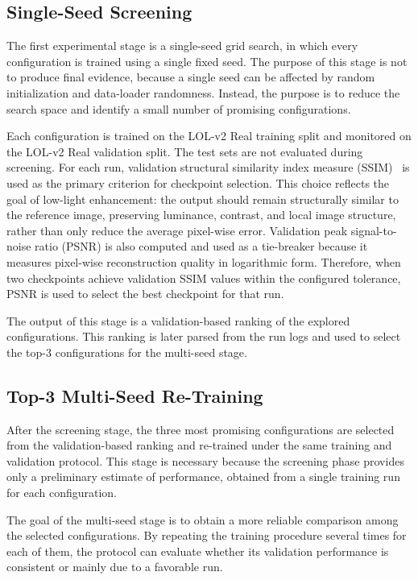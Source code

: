 

\subsection{Single-Seed Screening}

The first experimental stage is a single-seed grid search, in which every configuration is trained using a single fixed seed. The purpose of this stage is not to produce final evidence, because a single seed can be affected by random initialization and data-loader randomness. Instead, the purpose is to reduce the search space and identify a small number of promising configurations.

Each configuration is trained on the LOL-v2 Real training split and monitored on the LOL-v2 Real validation split. The test sets are not evaluated during screening. For each run, validation structural similarity index measure (SSIM)~\cite{DBLP:journals/tip/WangBSS04} is used as the primary criterion for checkpoint selection. This choice reflects the goal of low-light enhancement: the output should remain structurally similar to the reference image, preserving luminance, contrast, and local image structure, rather than only reduce the average pixel-wise error. Validation peak signal-to-noise ratio (PSNR) is also computed and used as a tie-breaker because it measures pixel-wise reconstruction quality in logarithmic form. Therefore, when two checkpoints achieve validation SSIM values within the configured tolerance, PSNR is used to select the best checkpoint for that run.

The output of this stage is a validation-based ranking of the explored configurations. This ranking is later parsed from the run logs and used to select the top-3 configurations for the multi-seed stage.

\subsection{Top-3 Multi-Seed Re-Training}

After the screening stage, the three most promising configurations are selected from the validation-based ranking and re-trained under the same training and validation protocol. This stage is necessary because the screening phase provides only a preliminary estimate of performance, obtained from a single training run for each configuration.

The goal of the multi-seed stage is to obtain a more reliable comparison among the selected configurations. By repeating the training procedure several times for each of them, the protocol can evaluate whether its validation performance is consistent or mainly due to a favorable run.

